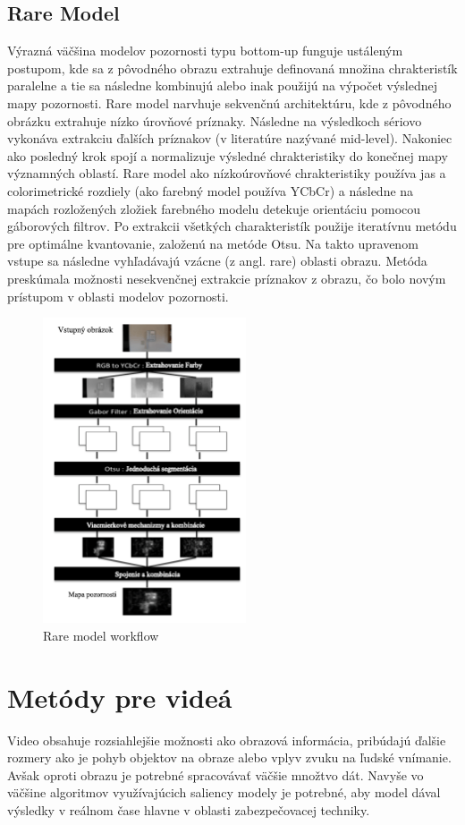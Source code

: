 \subsection{Rare Model}
Výrazná väčšina modelov pozornosti typu bottom-up funguje ustáleným postupom, kde sa z pôvodného obrazu extrahuje definovaná množina chrakteristík paralelne a tie sa následne kombinujú alebo inak použijú na výpočet výslednej mapy pozornosti.
Rare model narvhuje sekvenčnú architektúru, kde z pôvodného obrázku extrahuje nízko úrovňové príznaky.
Následne na výsledkoch sériovo vykonáva extrakciu ďalších príznakov (v literatúre nazývané mid-level).
Nakoniec ako posledný krok spojí a normalizuje výsledné chrakteristiky do konečnej mapy významných oblastí.
Rare model ako nízkoúrovňové chrakteristiky používa jas a colorimetrické rozdiely (ako farebný model používa YCbCr) a následne na mapách rozložených zložiek farebného modelu detekuje orientáciu pomocou gáborových filtrov\cite{rare-1}.
Po extrakcii všetkých charakteristík použije iteratívnu metódu pre optimálne kvantovanie, založenú na metóde Otsu\cite{otsu}.
Na takto upravenom vstupe sa následne vyhľadávajú vzácne (z angl. rare) oblasti obrazu.
Metóda preskúmala možnosti nesekvenčnej extrakcie príznakov z obrazu, čo bolo novým prístupom v oblasti modelov pozornosti.

\begin{figure}[H]
  \centering
  \includegraphics[width=6cm]{pics/rare-1-svk.png}
  \caption{Rare model workflow\cite{rare-1}}\label{wrap-fig:3}
\end{figure}

\section{Metódy pre videá}
Video obsahuje rozsiahlejšie možnosti ako obrazová informácia, pribúdajú ďalšie rozmery ako je pohyb objektov na obraze alebo vplyv zvuku na ľudské vnímanie.
Avšak oproti obrazu je potrebné spracovávať väčšie množtvo dát.
Navyše vo väčšine algoritmov využívajúcich saliency modely je potrebné, aby model dával výsledky v reálnom čase hlavne v oblasti zabezpečovacej techniky.
